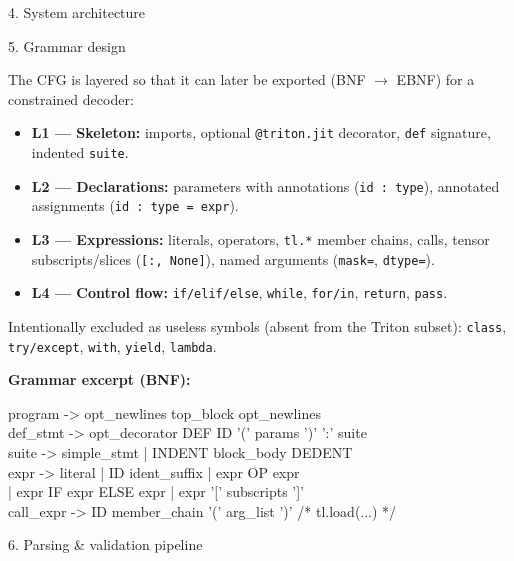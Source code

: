 \documentclass[final]{beamer}
\newlength{\colwidth}
\begin{document}
\begin{frame}[t]
\begin{columns}[t]
\begin{column}{\colwidth}
\begin{block}{4. System architecture}
  \end{block}

  \begin{block}{5. Grammar design}

    The CFG is layered so that it can later be exported (BNF $\rightarrow$
    EBNF) for a constrained decoder:

    \begin{itemize}
      \item \textbf{L1 — Skeleton:} imports, optional \texttt{@triton.jit}
        decorator, \texttt{def} signature, indented \texttt{suite}.
      \item \textbf{L2 — Declarations:} parameters with annotations
        (\texttt{id : type}), annotated assignments (\texttt{id : type = expr}).
      \item \textbf{L3 — Expressions:} literals, operators, \texttt{tl.*}
        member chains, calls, tensor subscripts/slices (\texttt{[:, None]}),
        named arguments (\texttt{mask=}, \texttt{dtype=}).
      \item \textbf{L4 — Control flow:} \texttt{if/elif/else},
        \texttt{while}, \texttt{for/in}, \texttt{return}, \texttt{pass}.
    \end{itemize}

    Intentionally excluded as useless symbols (absent from the Triton subset):
    \texttt{class}, \texttt{try/except}, \texttt{with}, \texttt{yield},
    \texttt{lambda}.

    \vspace{0.5em}
    \noindent\textbf{Grammar excerpt (BNF):}\\[0.3em]
    {\footnotesize\ttfamily\setlength{\parindent}{0pt}
    program -> opt\_newlines top\_block opt\_newlines\\
    def\_stmt -> opt\_decorator DEF ID '(' params ')' ':' suite\\
    suite -> simple\_stmt | INDENT block\_body DEDENT\\
    expr -> literal | ID ident\_suffix | expr OP expr\\
    \hspace*{3ex}| expr IF expr ELSE expr | expr '[' subscripts ']'\\
    call\_expr -> ID member\_chain '(' arg\_list ')' \quad /* tl.load(...) */\par}

  \end{block}

  \begin{block}{6. Parsing \& validation pipeline}


\end{block}
\end{column}
\end{columns}
\end{frame}
\end{document}
